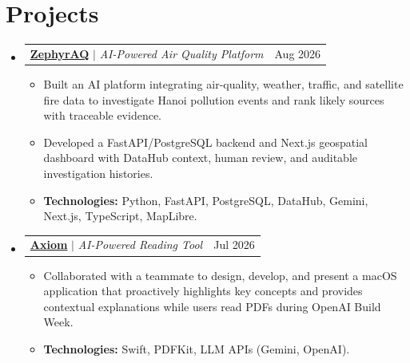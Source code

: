 \documentclass[a4paper,11pt]{article}
\makeatletter
\newcommand{\resumeItem}[1]{
  \item\small{
    {#1\par\vspace{-2pt}}
  }
}
\newcommand{\resumeProjectHeading}[2]{
  \item
    \begin{tabular*}{0.97\textwidth}{l@{\extracolsep{\fill}}r}
      \small#1 & #2 \\
    \end{tabular*}\vspace{-7pt}
}
\newcommand{\resumeSubHeadingListStart}{\begin{itemize}[leftmargin=0.15in, label={}]}
\newcommand{\resumeSubHeadingListEnd}{\end{itemize}}
\newcommand{\resumeItemListStart}{\begin{itemize}}
\newcommand{\resumeItemListEnd}{\end{itemize}\vspace{-5pt}}
\makeatother
\begin{document}
\section{Projects}
\resumeSubHeadingListStart
  \resumeProjectHeading
    {\textbf{\href{https://github.com/lhnminh/zephyr-aq}{ZephyrAQ}} $|$ \emph{AI-Powered Air Quality Platform}}{Aug 2026}
    \resumeItemListStart
      \resumeItem{Built an AI platform integrating air-quality, weather, traffic, and satellite fire data to investigate Hanoi pollution events and rank likely sources with traceable evidence.}
      \resumeItem{Developed a FastAPI/PostgreSQL backend and Next.js geospatial dashboard with DataHub context, human review, and auditable investigation histories.}
      \resumeItem{\textbf{Technologies:} Python, FastAPI, PostgreSQL, DataHub, Gemini, Next.js, TypeScript, MapLibre.}
    \resumeItemListEnd
  \resumeProjectHeading
    {\textbf{\href{https://github.com/lhnminh/axiom}{Axiom}} $|$ \emph{AI-Powered Reading Tool}}{Jul 2026}
    \resumeItemListStart
      \resumeItem{Collaborated with a teammate to design, develop, and present a macOS application that proactively highlights key concepts and provides contextual explanations while users read PDFs during OpenAI Build Week.}
      \resumeItem{\textbf{Technologies:} Swift, PDFKit, LLM APIs (Gemini, OpenAI).}
    \resumeItemListEnd
\resumeSubHeadingListEnd
\end{document}
